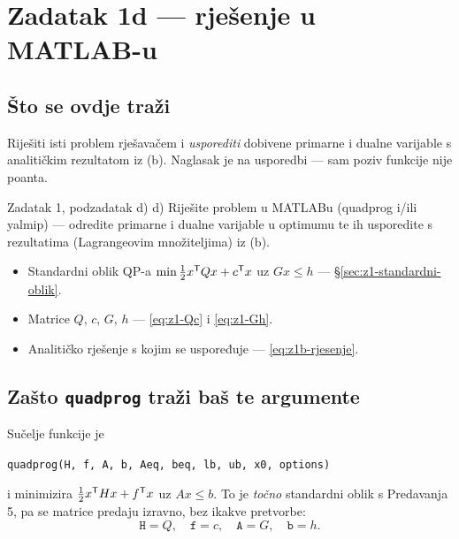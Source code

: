 \chapter{Zadatak 1d --- rješenje u MATLAB-u}
\label{ch:z1-matlab}

\section{Što se ovdje traži}

Riješiti isti problem rješavačem i \emph{usporediti} dobivene primarne i dualne
varijable s analitičkim rezultatom iz (b). Naglasak je na usporedbi --- sam
poziv funkcije nije poanta.

\begin{zadatak}{Zadatak 1, podzadatak d)}
d) Riješite problem u MATLABu (quadprog i/ili yalmip) --- odredite primarne i
dualne varijable u optimumu te ih usporedite s rezultatima (Lagrangeovim
množiteljima) iz (b).
\end{zadatak}

\begin{predznanje}
\begin{itemize}[nosep,leftmargin=*]
  \item Standardni oblik QP-a $\min \tfrac12 x^{\mathsf{T}} Qx + c^{\mathsf{T}} x$ uz $Gx \leq h$ --- \S\ref{sec:z1-standardni-oblik}.
  \item Matrice $Q$, $c$, $G$, $h$ --- \eqref{eq:z1-Qc} i \eqref{eq:z1-Gh}.
  \item Analitičko rješenje s kojim se uspoređuje --- \eqref{eq:z1b-rjesenje}.
\end{itemize}
\end{predznanje}

\section{Zašto \texttt{quadprog} traži baš te argumente}
\label{sec:z1d-sucelje}

Sučelje funkcije je
\begin{center}
\texttt{quadprog(H, f, A, b, Aeq, beq, lb, ub, x0, options)}
\end{center}
i minimizira $\tfrac12 x^{\mathsf{T}} H x + f^{\mathsf{T}} x$ uz $Ax \leq b$. To je \emph{točno}
standardni oblik s Predavanja 5, pa se matrice predaju izravno, bez ikakve
pretvorbe:
\begin{equation}
\texttt{H} = Q, \quad \texttt{f} = c, \quad \texttt{A} = G, \quad \texttt{b} = h .
\end{equation}

